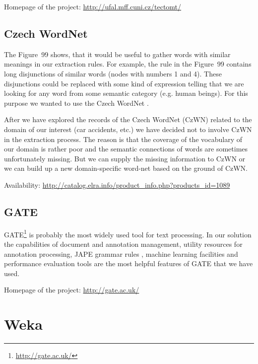 Homepage of the project: \url{http://ufal.mff.cuni.cz/tectomt/}


\subsection{Czech WordNet}

The Figure~99 shows, that it would be useful to gather words with similar meanings in our extraction rules. For example, the rule in the Figure~99 contains long disjunctions of similar words (nodes with numbers 1 and 4). These disjunctions could be replaced with some kind of expression telling that we are looking for any word from some semantic category (e.g. human beings). For this purpose we wanted to use the Czech WordNet \citep{biblio:WordNetCZ2004}. 

After we have explored the records of the Czech WordNet (CzWN) related to the domain of our interest (car accidents, etc.) we have decided not to involve CzWN in the extraction process. The reason is that the coverage of the vocabulary of our domain is rather poor and the semantic connections of words are sometimes unfortunately missing. But we can supply the missing information to CzWN or we can build up a new domain-specific word-net based on the ground of CzWN.  

Availability: \url{http://catalog.elra.info/product_info.php?products_id=1089}



\subsection{GATE}
GATE\footnote{\url{http://gate.ac.uk/}} \citep{biblio:GATE_ACL2002} is probably the most widely used tool for text processing. In our solution the capabilities of document and annotation management, utility resources for annotation processing, JAPE grammar rules \citep{Cunningham00jape:a}, machine learning facilities and performance evaluation tools are the most helpful features of GATE that we have used.

Homepage of the project: \url{http://gate.ac.uk/}


\section{Weka}

